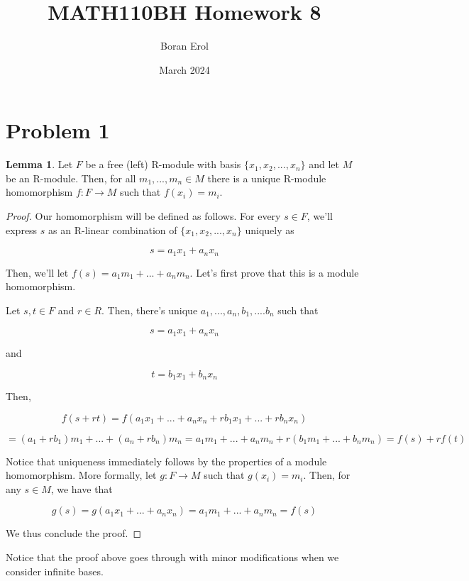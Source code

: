 \documentclass{article}
\title{MATH110BH Homework 8}
\date{March 2024}
\author{Boran Erol}
\theoremstyle{definition}
\newtheorem{lemma}[theorem]{Lemma}
\begin{document}
\maketitle

\section{Problem 1}

\begin{lemma}
    Let $F$ be a free (left) R-module with basis \( \{x_{1},x_{2},...,x_{n} \}\) and let $M$ be an R-module. Then, for all $m_{1},...,m_{n} \in M$ there is a unique R-module homomorphism $f: F \xrightarrow{} M$ such that $f(x_{i}) = m_{i}$. 
\end{lemma}
\begin{proof}
    Our homomorphism will be defined as follows. For every $s \in F$, we'll express $s$ as an R-linear combination of \( \{x_{1},x_{2},...,x_{n} \}\) uniquely as 

    \[ s = a_{1}x_{1} + a_{n}x_{n}\]

    Then, we'll let $f(s) = a_{1}m_{1} + ... + a_{n}m_{n}$.
    Let's first prove that this is a module homomorphism.
    
    Let $s,t \in F$ and $r \in R$. Then, there's unique $a_{1},...,a_{n},b_{1},....b_{n}$ such that

    \[ s = a_{1}x_{1} + a_{n}x_{n}\]

    and 

    \[ t = b_{1}x_{1} + b_{n}x_{n}\]

    Then,

    \[ f(s + rt) = f(a_{1}x_{1} + ... + a_{n}x_{n} + rb_{1}x_{1} + ... + rb_{n}x_{n}) \]
    
    \[= (a_{1}+rb_{1})m_{1} + ... + (a_{n} + rb_{n})m_{n} = a_{1}m_{1} + ... + a_{n}m_{n} + r (b_{1}m_{1} + ... + b_{n}m_{n}) = f(s) + rf(t)\]

    Notice that uniqueness immediately follows by the properties of a module homomorphism. More formally, let $g: F \xrightarrow{} M$ such that $g(x_{i}) = m_{i}$. Then, for any $s \in M$, we have that 

    \[g(s) = g(a_{1}x_{1} + ... + a_{n}x_{n}) = a_{1}m_{1} + ... + a_{n}m_{n} = f(s)\]

    We thus conclude the proof.
\end{proof}

Notice that the proof above goes through with minor modifications when we consider infinite bases.
\end{document}
